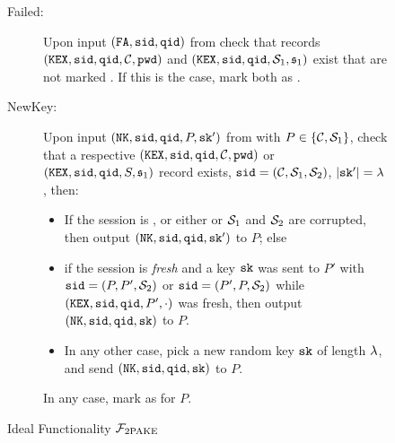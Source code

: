 \begin{figure}[tbp]
\begin{mdframed}[innertopmargin=10pt]
\begin{description}
  \item[Failed:] Upon input $(\mathtt{FA}, \mathtt{sid}, \mathtt{qid})$ from \SIM check that records $(\mathtt{KEX}, \mathtt{sid}, \mathtt{qid}, \mathcal{C}, \mathtt{pwd})$ and $(\mathtt{KEX}, \mathtt{sid}, \mathtt{qid}, \mathcal{S}_1, \mathfrak{s}_1)$ exist that are not marked \completed. 
      If this is the case, mark both as \failed.
	
	\item[NewKey:] Upon input $(\mathtt{NK}, \mathtt{sid},\mathtt{qid}, P, \mathtt{sk}')$ from \SIM with $P\in\{\mathcal{C},\mathcal{S}_1\}$, check that a respective $(\mathtt{KEX}, \mathtt{sid}, \mathtt{qid}, \mathcal{C}, \mathtt{pwd})$ or $(\mathtt{KEX}, \mathtt{sid}, \mathtt{qid}, S, \mathfrak{s}_1)$ record exists, $\mathtt{sid}=(\mathcal{C}, \mathcal{S}_1, \mathcal{S}_2)$, $|\mathtt{sk}'|=\lambda$, then: %
	\begin{itemize}
		\item If the session is \compromised, or either \Client or $\mathcal{S}_1$ and $\mathcal{S}_2$ are corrupted, then output $(\mathtt{NK}, \mathtt{sid},\mathtt{qid},\mathtt{sk}')$ to $P$; else
		
		\item if the session is \emph{fresh} and a key $\mathtt{sk}$ was sent to $P'$ with $\mathtt{sid}=(P, P', \mathcal{S}_2)$ or $\mathtt{sid}=(P', P, \mathcal{S}_2)$ while $(\mathtt{KEX}, \mathtt{sid}, \mathtt{qid}, P', \cdot)$ was fresh, then output $(\mathtt{NK}, \mathtt{sid}, \mathtt{qid}, \mathtt{sk})$ to $P$.
		
		\item In any other case, pick a new random key $\mathtt{sk}$ of length $\lambda$, and send $(\mathtt{NK}, \mathtt{sid}, \mathtt{qid}, \mathtt{sk})$ to $P$.
	\end{itemize}
	In any case, mark \qid as \completed for $P$.
	
\end{description}
\end{mdframed}
\caption{Ideal Functionality $\mathcal{F}_{\mathrm{2PAKE}}$}
\label{fig:2pakef}
\end{figure}

